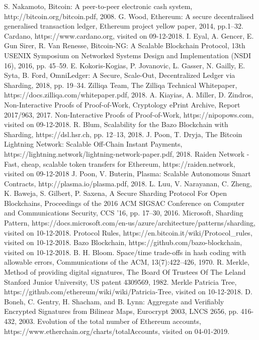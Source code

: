 \documentclass[conference]{IEEEtran}
\begin{document}
\begin{thebibliography}{00}
 S. Nakamoto, Bitcoin: A peer-to-peer electronic cash system, http://bitcoin.org/bitcoin.pdf, 2008.
 G. Wood, Ethereum: A secure decentralised generalised transaction ledger, Ethereum project yellow paper, 2014, pp.1--32.
 Cardano, https://www.cardano.org, visited on 09-12-2018.
 I. Eyal, A. Gencer, E. Gun Sirer, R. Van Renesse, Bitcoin-NG: A Scalable Blockchain Protocol, 13th {USENIX} Symposium on Networked Systems Design and Implementation ({NSDI} 16), 2016, pp. 45--59.
 E. Kokoris-Kogias, P. Jovanovic, L. Gasser, N. Gailly, E. Syta, B. Ford, OmniLedger: A Secure, Scale-Out, Decentralized Ledger via Sharding, 2018, pp. 19--34.
 Zilliqa Team, The Zilliqa Technical Whitepaper, https://docs.zilliqa.com/whitepaper.pdf, 2018.
 A. Kiayias, A. Miller, D. Zindros, Non-Interactive Proofs of Proof-of-Work, Cryptology ePrint Archive, Report 2017/963, 2017.
 Non-Interactive Proofs of Proof-of-Work, https://nipopows.com, visited on 09-12-2018.
 R. Blum, Scalability for the Bazo Blockchain with Sharding, https://dsl.hsr.ch, pp. 12--13, 2018.
 J. Poon, T. Dryja, The Bitcoin Lightning Network: Scalable Off-Chain Instant Payments, https://lightning.network/lightning-network-paper.pdf, 2018.
 Raiden Network - Fast, cheap, scalable token transfers for Ethereum, https://raiden.network, visited on 09-12-2018
 J. Poon, V. Buterin, Plasma: Scalable Autonomous Smart Contracts, http://plasma.io/plasma.pdf, 2018.
 L. Luu, V. Narayanan, C. Zheng, K. Baweja, S. Gilbert, P. Saxena, A Secure Sharding Protocol For Open Blockchains, Proceedings of the 2016 ACM SIGSAC Conference on Computer and Communications Security, CCS '16, pp. 17--30, 2016.
 Microsoft, Sharding Pattern, https://docs.microsoft.com/en-us/azure/architecture/patterns/sharding, visited on 10-12-2018.
 Protocol Rules, https://en.bitcoin.it/wiki/Protocol\_rules, visited on 10-12-2018.
 Bazo Blockchain, https://github.com/bazo-blockchain, visited on 10-12-2018.
 B. H. Bloom. Space/time trade-offs in hash coding with allowable errors, Communications of the ACM, 13(7):422–426, 1970.
 R. Merkle, Method of providing digital signatures, The Board Of Trustees Of The Leland Stanford Junior University, US patent 4309569, 1982.
 Merkle Patricia Tree, https://github.com/ethereum/wiki/wiki/Patricia-Tree, visited on 10-12-2018.
 D. Boneh, C. Gentry, H. Shacham, and B. Lynn: Aggregate and Verifiably Encrypted Signatures from Bilinear Maps, Eurocrypt 2003, LNCS 2656, pp. 416-432, 2003.
 Evolution of the total number of Ethereum accounts, https://www.etherchain.org/charts/totalAccounts, visited on 04-01-2019.

\end{thebibliography}
\end{document}
